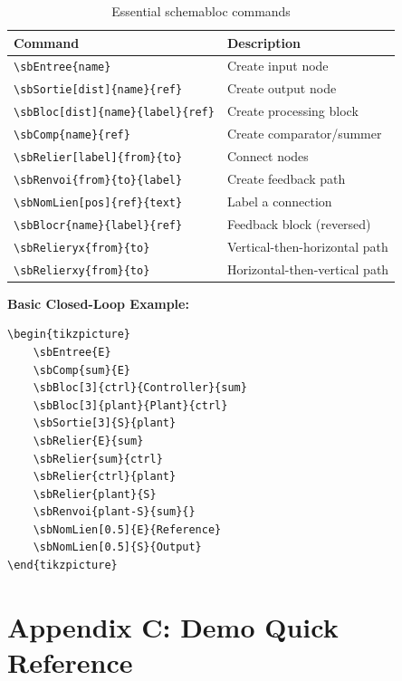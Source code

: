 \documentclass[11pt,letterpaper]{article}
\begin{document}
\begin{table}[H]
\centering
\begin{tabular}{@{}ll@{}}
\toprule
\textbf{Command} & \textbf{Description} \\
\midrule
\verb|\sbEntree{name}| & Create input node \\
\verb|\sbSortie[dist]{name}{ref}| & Create output node \\
\verb|\sbBloc[dist]{name}{label}{ref}| & Create processing block \\
\verb|\sbComp{name}{ref}| & Create comparator/summer \\
\verb|\sbRelier[label]{from}{to}| & Connect nodes \\
\verb|\sbRenvoi{from}{to}{label}| & Create feedback path \\
\verb|\sbNomLien[pos]{ref}{text}| & Label a connection \\
\verb|\sbBlocr{name}{label}{ref}| & Feedback block (reversed) \\
\verb|\sbRelieryx{from}{to}| & Vertical-then-horizontal path \\
\verb|\sbRelierxy{from}{to}| & Horizontal-then-vertical path \\
\bottomrule
\end{tabular}
\caption{Essential schemabloc commands}
\end{table}

\textbf{Basic Closed-Loop Example:}
\begin{verbatim}
\begin{tikzpicture}
    \sbEntree{E}
    \sbComp{sum}{E}
    \sbBloc[3]{ctrl}{Controller}{sum}
    \sbBloc[3]{plant}{Plant}{ctrl}
    \sbSortie[3]{S}{plant}
    \sbRelier{E}{sum}
    \sbRelier{sum}{ctrl}
    \sbRelier{ctrl}{plant}
    \sbRelier{plant}{S}
    \sbRenvoi{plant-S}{sum}{}
    \sbNomLien[0.5]{E}{Reference}
    \sbNomLien[0.5]{S}{Output}
\end{tikzpicture}
\end{verbatim}

\newpage
\section*{Appendix C: Demo Quick Reference}
\end{document}
